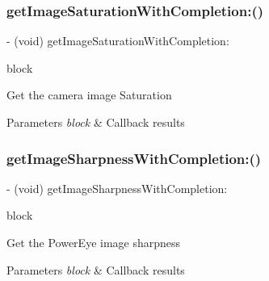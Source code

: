 \subsubsection{\texorpdfstring{get\+Image\+Saturation\+With\+Completion\+:()}{getImageSaturationWithCompletion:()}}
{\footnotesize\ttfamily -\/ (void) get\+Image\+Saturation\+With\+Completion\+: \begin{DoxyParamCaption}\item[{(void($^\wedge$)(N\+S\+Integer saturation, N\+S\+Error $\ast$\hyperlink{group___p_v_s_d_k___c_o_r_e___a_p_i___m_o_u_n_t_c_o_n_t_r_o_l_ga5a1de33b230662127568783314b4a54d}{\+\_\+\+Nullable} error))}]{block }\end{DoxyParamCaption}}

Get the camera image Saturation


\begin{DoxyParams}{Parameters}
{\em block} & Callback results \\
\hline
\end{DoxyParams}
\mbox{\label{interface_p_v_camera_a8356a196f4c15b712f23b36a712b5e21}} 
\subsubsection{\texorpdfstring{get\+Image\+Sharpness\+With\+Completion\+:()}{getImageSharpnessWithCompletion:()}}
{\footnotesize\ttfamily -\/ (void) get\+Image\+Sharpness\+With\+Completion\+: \begin{DoxyParamCaption}\item[{(void($^\wedge$)(N\+S\+Integer sharpness, N\+S\+Error $\ast$\hyperlink{group___p_v_s_d_k___c_o_r_e___a_p_i___m_o_u_n_t_c_o_n_t_r_o_l_ga5a1de33b230662127568783314b4a54d}{\+\_\+\+Nullable} error))}]{block }\end{DoxyParamCaption}}

Get the Power\+Eye image sharpness


\begin{DoxyParams}{Parameters}
{\em block} & Callback results \\
\hline
\end{DoxyParams}
\mbox{\label{interface_p_v_camera_a98d62c4d59b5135ea417ea32e5c9e9d0}} 
